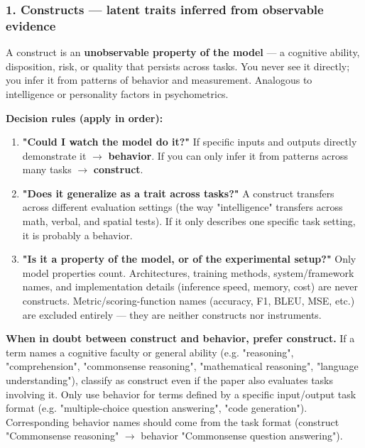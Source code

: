 \begin{tcolorbox}[breakable,enhanced,colback=blue!3,colframe=blue!40!black,title={Prompt},fonttitle=\bfseries,left=8pt,right=8pt,top=6pt,bottom=6pt]
\subsubsection*{1. Constructs --- latent traits inferred from observable evidence}

A construct is an \textbf{unobservable property of the model} --- a cognitive ability, disposition, risk, or quality that persists across tasks. You never see it directly; you infer it from patterns of behavior and measurement. Analogous to intelligence or personality factors in psychometrics.

\textbf{Decision rules (apply in order):}
\begin{enumerate}
\item \textbf{"Could I watch the model do it?"} If specific inputs and outputs directly demonstrate it $\rightarrow$ \textbf{behavior}. If you can only infer it from patterns across many tasks $\rightarrow$ \textbf{construct}.
\item \textbf{"Does it generalize as a trait across tasks?"} A construct transfers across different evaluation settings (the way "intelligence" transfers across math, verbal, and spatial tests). If it only describes one specific task setting, it is probably a behavior.
\item \textbf{"Is it a property of the model, or of the experimental setup?"} Only model properties count. Architectures, training methods, system/framework names, and implementation details (inference speed, memory, cost) are never constructs. Metric/scoring-function names (accuracy, F1, BLEU, MSE, etc.) are excluded entirely --- they are neither constructs nor instruments.
\end{enumerate}

\textbf{When in doubt between construct and behavior, prefer construct.} If a term names a cognitive faculty or general ability (e.g. "reasoning", "comprehension", "commonsense reasoning", "mathematical reasoning", "language understanding"), classify as construct even if the paper also evaluates tasks involving it. Only use behavior for terms defined by a specific input/output task format (e.g. "multiple-choice question answering", "code generation"). Corresponding behavior names should come from the task format (construct "Commonsense reasoning" $\rightarrow$ behavior "Commonsense question answering").


\end{tcolorbox}
